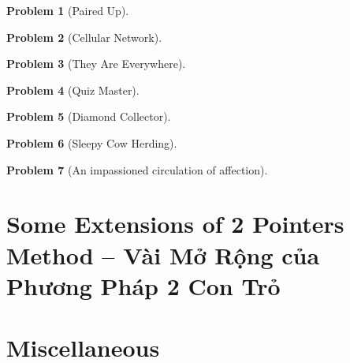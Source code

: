 \documentclass{article}
\newtheorem{problem}{Problem}
\begin{document}
\begin{problem}[Paired Up]

\end{problem}

\begin{problem}[Cellular Network]

\end{problem}

\begin{problem}[They Are Everywhere]

\end{problem}

\begin{problem}[Quiz Master]

\end{problem}

\begin{problem}[Diamond Collector]

\end{problem}

\begin{problem}[Sleepy Cow Herding]

\end{problem}

\begin{problem}[An impassioned circulation of affection]

\end{problem}


\section{Some Extensions of 2 Pointers Method -- Vài Mở Rộng của Phương Pháp 2 Con Trỏ}




\section{Miscellaneous}


\printbibliography[heading=bibintoc]
\end{document}
